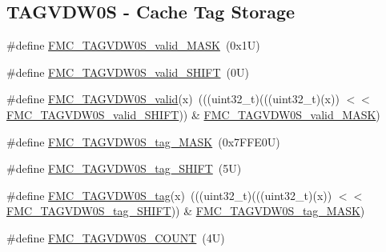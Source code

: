 \subsection*{T\+A\+G\+V\+D\+W0S -\/ Cache Tag Storage}
\begin{DoxyCompactItemize}
\item 
\#define \mbox{\hyperlink{group___f_m_c___register___masks_ga53cc204af469276cc9972aff2749de4c}{F\+M\+C\+\_\+\+T\+A\+G\+V\+D\+W0\+S\+\_\+valid\+\_\+\+M\+A\+SK}}~(0x1\+U)
\item 
\#define \mbox{\hyperlink{group___f_m_c___register___masks_ga4146a7816c19b4a472f7f0b4eca88677}{F\+M\+C\+\_\+\+T\+A\+G\+V\+D\+W0\+S\+\_\+valid\+\_\+\+S\+H\+I\+FT}}~(0\+U)
\item 
\#define \mbox{\hyperlink{group___f_m_c___register___masks_ga8839d56cb8f5e3552ac605fc25c72de1}{F\+M\+C\+\_\+\+T\+A\+G\+V\+D\+W0\+S\+\_\+valid}}(x)~(((uint32\+\_\+t)(((uint32\+\_\+t)(x)) $<$$<$ \mbox{\hyperlink{group___f_m_c___register___masks_ga4146a7816c19b4a472f7f0b4eca88677}{F\+M\+C\+\_\+\+T\+A\+G\+V\+D\+W0\+S\+\_\+valid\+\_\+\+S\+H\+I\+FT}})) \& \mbox{\hyperlink{group___f_m_c___register___masks_ga53cc204af469276cc9972aff2749de4c}{F\+M\+C\+\_\+\+T\+A\+G\+V\+D\+W0\+S\+\_\+valid\+\_\+\+M\+A\+SK}})
\item 
\#define \mbox{\hyperlink{group___f_m_c___register___masks_ga142a31eebf09fdb7f94e62f371e6a5f5}{F\+M\+C\+\_\+\+T\+A\+G\+V\+D\+W0\+S\+\_\+tag\+\_\+\+M\+A\+SK}}~(0x7\+F\+F\+E0\+U)
\item 
\#define \mbox{\hyperlink{group___f_m_c___register___masks_ga98f1e6497478f043fb34fa0657777807}{F\+M\+C\+\_\+\+T\+A\+G\+V\+D\+W0\+S\+\_\+tag\+\_\+\+S\+H\+I\+FT}}~(5\+U)
\item 
\#define \mbox{\hyperlink{group___f_m_c___register___masks_gaf6713d1ea74fc0a7aac58b6cfb2f16a1}{F\+M\+C\+\_\+\+T\+A\+G\+V\+D\+W0\+S\+\_\+tag}}(x)~(((uint32\+\_\+t)(((uint32\+\_\+t)(x)) $<$$<$ \mbox{\hyperlink{group___f_m_c___register___masks_ga98f1e6497478f043fb34fa0657777807}{F\+M\+C\+\_\+\+T\+A\+G\+V\+D\+W0\+S\+\_\+tag\+\_\+\+S\+H\+I\+FT}})) \& \mbox{\hyperlink{group___f_m_c___register___masks_ga142a31eebf09fdb7f94e62f371e6a5f5}{F\+M\+C\+\_\+\+T\+A\+G\+V\+D\+W0\+S\+\_\+tag\+\_\+\+M\+A\+SK}})
\item 
\#define \mbox{\hyperlink{group___f_m_c___register___masks_gab10049b0532a7422c9a3d7c5deb4cd49}{F\+M\+C\+\_\+\+T\+A\+G\+V\+D\+W0\+S\+\_\+\+C\+O\+U\+NT}}~(4\+U)
\end{DoxyCompactItemize}

